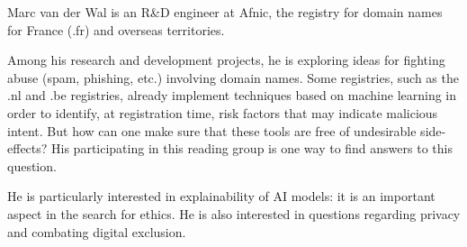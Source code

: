 \documentclass[journal]{IEEEtran}
\begin{document}
\begin{IEEEbiographynophoto}{Marc van der Wal}
  is an  R\&D engineer  at Afnic,  the registry  for domain  names for
  France (.fr) and overseas territories.

  Among his research  and development projects, he  is exploring ideas
  for  fighting   abuse  (spam,  phishing,  etc.)    involving  domain
  names. Some registries, such as  the .nl and .be registries, already
  implement techniques based on machine learning in order to identify,
  at  registration  time, risk  factors  that  may indicate  malicious
  intent.  But  how can  one make  sure that these  tools are  free of
  undesirable side-effects?   His participating in this  reading group
  is one way to find answers to this question.

  He is particularly interested in  explainability of AI models: it is
  an important aspect in the search  for ethics. He is also interested
  in questions regarding privacy and combating digital exclusion.
\end{IEEEbiographynophoto}
\end{document}
